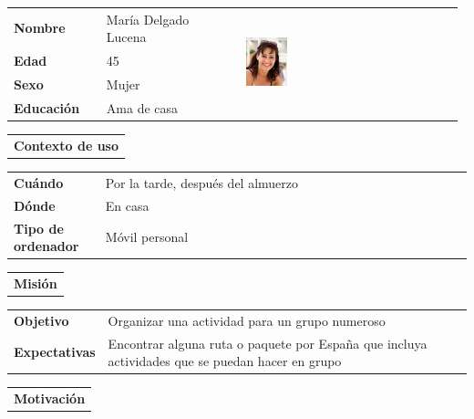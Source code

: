 \documentclass[11pt]{article}
\begin{document}
\begin{table}[H]
	\centering
	\begin{tabular}{p{0.2\linewidth}|p{0.3\linewidth}p{0.475\linewidth}}
		\toprule
		\textbf{Nombre} & María Delgado Lucena &\multirow{4}{*}{\begin{minipage}{1.\textwidth}\includegraphics[width=0.2\textwidth, height=30mm]{Maria}\end{minipage}}\\
		\textbf{Edad} & 45 & \\
		\textbf{Sexo} & Mujer & \\
		\textbf{Educación} & Ama de casa & \\
		\bottomrule
	\end{tabular}
	
	\begin{tabular}{l}
		\textbf{Contexto de uso} 
	\end{tabular}
	
	\begin{tabular}{p{0.2\linewidth}|p{0.8\linewidth}}
		\toprule
		\textbf{Cuándo} & Por la tarde, después del almuerzo \\
		\textbf{Dónde}  & En casa\\
		\textbf{Tipo de ordenador} & Móvil personal\\
		\bottomrule
	\end{tabular}
	
	\begin{tabular}{l}
		\textbf{Misión} 
	\end{tabular}
	
	\begin{tabular}{p{0.2\linewidth}|p{0.8\linewidth}}
		\toprule
		\textbf{Objetivo} & Organizar una actividad para un grupo numeroso\\
		\textbf{Expectativas}  & Encontrar alguna ruta o paquete por España que incluya actividades que se puedan hacer en grupo \\
		\bottomrule
	\end{tabular}
	
	\begin{tabular}{l}
		\textbf{Motivación} 
	\end{tabular}
	

\end{table}
\end{document}
